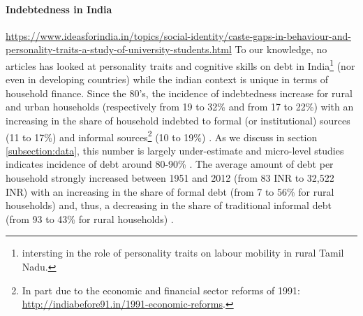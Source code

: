 \documentclass[a4paper, 11pt, onecolumn]{article}
\begin{document}
\paragraph{Indebtedness in India}
\url{https://www.ideasforindia.in/topics/social-identity/caste-gaps-in-behaviour-and-personality-traits-a-study-of-university-students.html}
To our knowledge, no articles has looked at personality traits and cognitive skills on debt in India\footnote{\cite{Michiels2021} intersting in the role of personality traits on labour mobility in rural Tamil Nadu.} (nor even in developing countries) while the indian context is unique in terms of household finance.
Since the 80's, the incidence of indebtedness increase for rural and urban households (respectively from 19 to 32\% and from 17 to 22\%) with an increasing in the share of household indebted to formal (or institutional) sources (11 to 17\%) and informal sources\footnote{In part due to the economic and financial sector reforms of 1991: \url{http://indiabefore91.in/1991-economic-reforms}.} (10 to 19\%) \citep{Rajakumar2019}.
As we discuss in section \ref{subsection:data}, this number is largely under-estimate \citep{Jones1994} and micro-level studies indicates incidence of debt around 80-90\% \citep{Guerin2013a, Jones1994, Dreze1997, Reboul2021}.
The average amount of debt per household strongly increased between 1951 and 2012 (from 83 INR to 32,522 INR) with an increasing in the share of formal debt (from 7 to 56\% for rural households) and, thus, a decreasing in the share of traditional informal debt (from 93 to 43\% for rural households) \citep{Rajakumar2019}.



\end{document}
